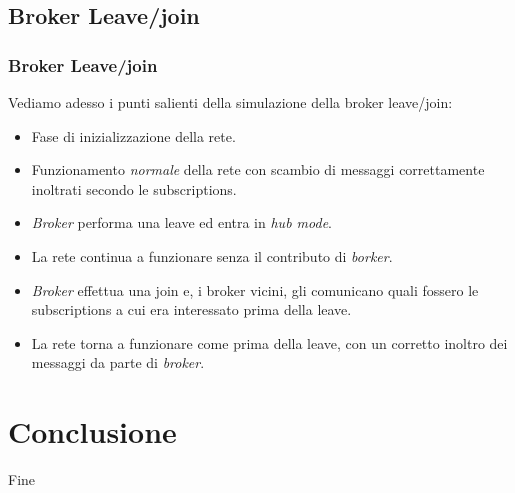 \documentclass{beamer}
\begin{document}
\begin{frame}

	

\end{frame}

\subsection{Broker Leave/join}

\begin{frame}
	\frametitle{Broker Leave/join}
	
	Vediamo adesso i punti salienti della simulazione della broker leave/join:
	\begin{itemize}
		\item Fase di inizializzazione della rete.
		\item Funzionamento \emph{normale} della rete con scambio di messaggi correttamente inoltrati secondo le subscriptions.
		\item \emph{Broker} performa una leave ed entra in \emph{hub mode}.
		\item La rete continua a funzionare senza il contributo di \emph{borker}.
		\item \emph{Broker} effettua una join e, i broker vicini, gli comunicano quali fossero le subscriptions a cui era interessato prima della leave.
		\item La rete torna a funzionare come prima della leave, con un corretto inoltro dei messaggi da parte di \emph{broker}.
	\end{itemize}
\end{frame}

\begin{frame}
	
	
	
\end{frame}

\section{Conclusione}
\begin{frame}
	\Huge{\centerline{Fine}}
\end{frame}

\end{document}

